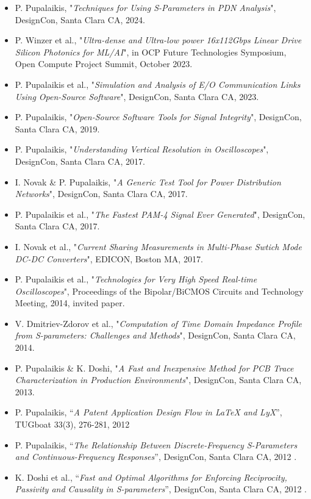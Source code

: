 \documentclass[10pt,letterpaper]{extarticle}
\newenvironment{indentsection}[1]%
{\begin{list}{}%
	{\setlength{\leftmargin}{#1}}%
	\item[]%
}
{\end{list}}
\begin{document}
\begin{indentsection}{-1em}\begin{itemize}
\parskip=-0.2em
\item P. Pupalaikis, "\emph{Techniques for Using S-Parameters in PDN Analysis}", DesignCon, Santa Clara CA, 2024.
\item P. Winzer et al., "\emph{Ultra­-dense and Ultra-­low power 16x112­Gbps Linear Drive Silicon Photonics
for ML/AI}",  in OCP Future Technologies Symposium, Open Compute Project Summit, October 2023.
\item P. Pupalaikis et al., "\emph{Simulation and Analysis of E/O Communication Links Using Open-Source Software}", DesignCon, Santa Clara CA, 2023.
\item P. Pupalaikis, "\emph{Open-Source Software Tools for Signal Integrity}", DesignCon, Santa Clara CA, 2019.
\item P. Pupalaikis, "\emph{Understanding Vertical Resolution in Oscilloscopes}", DesignCon, Santa Clara CA, 2017.
\item I. Novak \& P. Pupalaikis, "\emph{A Generic Test Tool for Power Distribution Networks}", DesignCon, Santa Clara CA, 2017.
\item P. Pupalaikis et al., "\emph{The Fastest PAM-4 Signal Ever Generated}", DesignCon, Santa Clara CA, 2017.
\item I. Novak et al., "\emph{Current Sharing Measurements in Multi-Phase Swtich Mode DC-DC Converters}", EDICON, Boston MA, 2017. 
\item P. Pupalaikis et al., "\emph{Technologies for Very High Speed Real-time Oscilloscopes}", Proceedings of the Bipolar/BiCMOS Circuits and Technology Meeting, 2014, invited paper.
\item  V. Dmitriev-Zdorov et al., "\emph{Computation of Time Domain Impedance Profile from S-parameters: Challenges and Methods}", DesignCon, Santa Clara CA, 2014.
\item P. Pupalaikis \& K. Doshi, "\emph{A Fast and Inexpensive Method for PCB Trace Characterization in Production Environments}", DesignCon, Santa Clara CA, 2013.
\item P. Pupalaikis, “\emph{A Patent Application Design Flow in LaTeX and LyX}”, TUGboat 33(3), 276-281, 2012
\item P. Pupalaikis, “\emph{The Relationship Between Discrete-Frequency S-Parameters and Continuous-Frequency Responses}”, DesignCon, Santa Clara CA, 2012 .
\item K. Doshi et al., “\emph{Fast and Optimal Algorithms for Enforcing Reciprocity, Passivity and Causality in S-parameters}”, DesignCon, Santa Clara CA, 2012 .

\end{itemize}
\end{indentsection}
\end{document}

